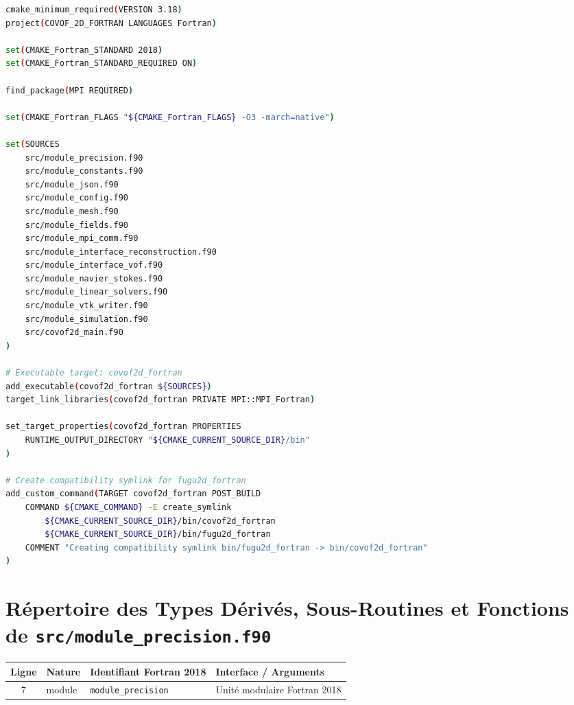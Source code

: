 \documentclass[10pt,a4paper,oneside]{book}
\begin{document}
\begin{lstlisting}[language={bash}]
cmake_minimum_required(VERSION 3.18)
project(COVOF_2D_FORTRAN LANGUAGES Fortran)

set(CMAKE_Fortran_STANDARD 2018)
set(CMAKE_Fortran_STANDARD_REQUIRED ON)

find_package(MPI REQUIRED)

set(CMAKE_Fortran_FLAGS "${CMAKE_Fortran_FLAGS} -O3 -march=native")

set(SOURCES
    src/module_precision.f90
    src/module_constants.f90
    src/module_json.f90
    src/module_config.f90
    src/module_mesh.f90
    src/module_fields.f90
    src/module_mpi_comm.f90
    src/module_interface_reconstruction.f90
    src/module_interface_vof.f90
    src/module_navier_stokes.f90
    src/module_linear_solvers.f90
    src/module_vtk_writer.f90
    src/module_simulation.f90
    src/covof2d_main.f90
)

# Executable target: covof2d_fortran
add_executable(covof2d_fortran ${SOURCES})
target_link_libraries(covof2d_fortran PRIVATE MPI::MPI_Fortran)

set_target_properties(covof2d_fortran PROPERTIES
    RUNTIME_OUTPUT_DIRECTORY "${CMAKE_CURRENT_SOURCE_DIR}/bin"
)

# Create compatibility symlink for fugu2d_fortran
add_custom_command(TARGET covof2d_fortran POST_BUILD
    COMMAND ${CMAKE_COMMAND} -E create_symlink
        ${CMAKE_CURRENT_SOURCE_DIR}/bin/covof2d_fortran
        ${CMAKE_CURRENT_SOURCE_DIR}/bin/fugu2d_fortran
    COMMENT "Creating compatibility symlink bin/fugu2d_fortran -> bin/covof2d_fortran"
)

\end{lstlisting}

\section{Répertoire des Types Dérivés, Sous-Routines et Fonctions de \texttt{src/module\_precision.f90}}
\begin{center}\small
\begin{tabular}{clll}
\toprule
\textbf{Ligne} & \textbf{Nature} & \textbf{Identifiant Fortran 2018} & \textbf{Interface / Arguments} \\
\midrule
7 & module & \texttt{module\_precision} & Unité modulaire Fortran 2018 \\
\bottomrule
\end{tabular}
\end{center}
\end{document}
